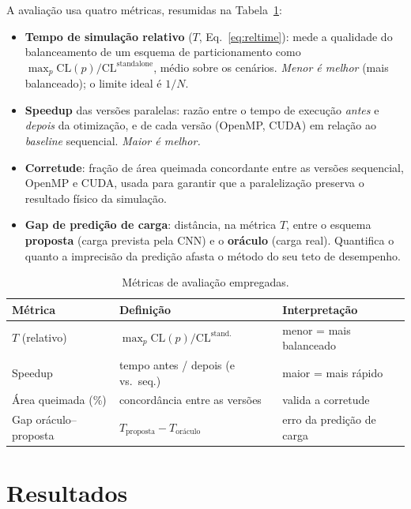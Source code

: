 \documentclass[12pt]{article}
\begin{document}
A avaliação usa quatro métricas, resumidas na Tabela~\ref{tab:metricas}:

\begin{itemize}
  \item \textbf{Tempo de simulação relativo} ($T$, Eq.~\ref{eq:reltime}): mede a
    qualidade do balanceamento de um esquema de particionamento como
    $\max_p \mathrm{CL}(p)/\mathrm{CL}^{\text{standalone}}$, médio sobre os
    cenários. \emph{Menor é melhor} (mais balanceado); o limite ideal é $1/N$.
  \item \textbf{Speedup} das versões paralelas: razão entre o tempo de execução
    \emph{antes} e \emph{depois} da otimização, e de cada versão (OpenMP, CUDA)
    em relação ao \textit{baseline} sequencial. \emph{Maior é melhor.}
  \item \textbf{Corretude}: fração de área queimada concordante entre as versões
    sequencial, OpenMP e CUDA, usada para garantir que a paralelização preserva o
    resultado físico da simulação.
  \item \textbf{Gap de predição de carga}: distância, na métrica $T$, entre o
    esquema \textbf{proposta} (carga prevista pela CNN) e o \textbf{oráculo} (carga
    real). Quantifica o quanto a imprecisão da predição afasta o método do seu
    teto de desempenho.
\end{itemize}

\begin{table}[ht]
\centering
\caption{Métricas de avaliação empregadas.}
\label{tab:metricas}
\begin{tabular}{lll}
\toprule
\textbf{Métrica} & \textbf{Definição} & \textbf{Interpretação} \\
\midrule
$T$ (relativo)        & $\max_p \mathrm{CL}(p)/\mathrm{CL}^{\text{stand.}}$ & menor = mais balanceado \\
Speedup               & tempo antes / depois (e vs.\ seq.)                 & maior = mais rápido \\
Área queimada (\%)    & concordância entre as versões                      & valida a corretude \\
Gap oráculo--proposta & $T_{\text{proposta}} - T_{\text{oráculo}}$         & erro da predição de carga \\
\bottomrule
\end{tabular}
\end{table}

\section{Resultados}
\end{document}
